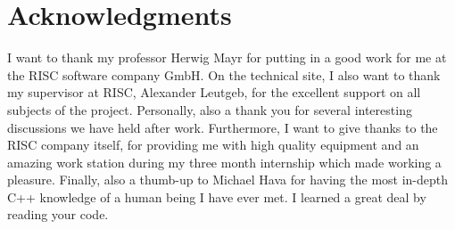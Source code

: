 \section*{Acknowledgments}

I want to thank my professor Herwig Mayr for putting in a good work for me at the RISC software company GmbH. On the technical site, I also want to thank my supervisor at RISC, Alexander Leutgeb, for the excellent support on all subjects of the project. Personally, also a thank you for several interesting discussions we have held after work. Furthermore, I want to give thanks to the RISC company itself, for providing me with high quality equipment and an amazing work station during my three month internship which made working a pleasure. Finally, also a thumb-up to Michael Hava for having the most in-depth C++ knowledge of a human being I have ever met. I learned a great deal by reading your code.
